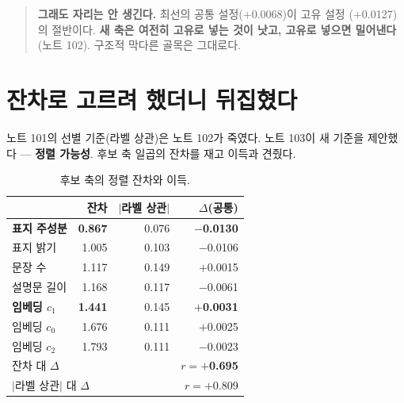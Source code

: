\documentclass[10pt]{article}
\begin{document}

\begin{quote}\fontsize{9.5}{11.5}\selectfont
\textbf{그래도 자리는 안 생긴다.} 최선의 공통 설정($+$0.0068)이 고유 설정
($+$0.0127)의 절반이다. \textbf{새 축은 여전히 고유로 넣는 것이 낫고, 고유로
넣으면 밀어낸다}(노트 102). 구조적 막다른 골목은 그대로다.
\end{quote}

\section{잔차로 고르려 했더니 뒤집혔다}

노트 101의 선별 기준(라벨 상관)은 노트 102가 죽였다. 노트 103이 새 기준을
제안했다 --- \textbf{정렬 가능성}. 후보 축 일곱의 잔차를 재고 이득과 견줬다.

\begin{table}[t]
\centering\tsize
\caption{후보 축의 정렬 잔차와 이득.}
\begin{tabular}{lrrr}
\toprule
& 잔차 & $|$라벨 상관$|$ & $\Delta$(공통) \\
\midrule
\textbf{표지 주성분} & \textbf{0.867} & 0.076 & \textbf{$-$0.0130} \\
표지 밝기 & 1.005 & 0.103 & $-$0.0106 \\
문장 수 & 1.117 & 0.149 & $+$0.0015 \\
설명문 길이 & 1.168 & 0.117 & $-$0.0061 \\
\textbf{임베딩 $c_1$} & \textbf{1.441} & 0.145 & \textbf{$+$0.0031} \\
임베딩 $c_0$ & 1.676 & 0.111 & $+$0.0025 \\
임베딩 $c_2$ & 1.793 & 0.111 & $-$0.0023 \\
\midrule
\multicolumn{2}{l}{잔차 대 $\Delta$} & & \textbf{$r{=}+$0.695} \\
\multicolumn{2}{l}{$|$라벨 상관$|$ 대 $\Delta$} & & $r{=}+$0.809 \\
\bottomrule
\end{tabular}
\end{table}

\end{document}
